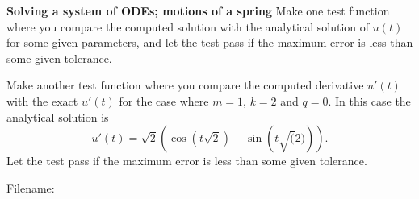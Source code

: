 \begin{Problem}{\textbf{Solving a system of ODEs; motions of a spring}}
Make one test function where you compare the computed solution with the analytical solution of $u(t)$ for some given parameters, and let the test pass if the maximum error is less than some given tolerance.  

Make another test function where you compare the computed derivative $u'(t)$ with the exact $u'(t)$ for the case where $m=1$, $k=2$ and $q=0$. In this case the analytical solution is
\begin{equation*}
u'(t)= \sqrt{2}\left(\cos\left(t\sqrt{2}\right) - \sin\left(t\sqrt(2) \right)\right).
\end{equation*}
Let the test pass if the maximum error is less than some given tolerance.

Filename: 
\end{Problem}


